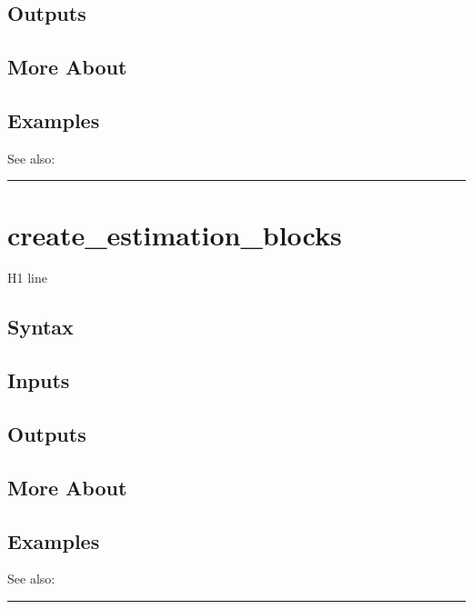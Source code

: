 \documentclass[letterpaper,10pt,english]{sphinxmanual}
\begin{document}
\subsection{Outputs}
\label{classes/models/@dsge/dsge:id11}

\subsection{More About}
\label{classes/models/@dsge/dsge:id12}

\subsection{Examples}
\label{classes/models/@dsge/dsge:id13}
See also:


\bigskip\hrule{}\bigskip



\section{create\_estimation\_blocks}
\label{classes/models/@dsge/dsge:create-estimation-blocks}\label{classes/models/@dsge/dsge:id14}
H1 line


\subsection{Syntax}
\label{classes/models/@dsge/dsge:id15}

\subsection{Inputs}
\label{classes/models/@dsge/dsge:id16}

\subsection{Outputs}
\label{classes/models/@dsge/dsge:id17}

\subsection{More About}
\label{classes/models/@dsge/dsge:id18}

\subsection{Examples}
\label{classes/models/@dsge/dsge:id19}
See also:


\bigskip\hrule{}\bigskip
\end{document}
